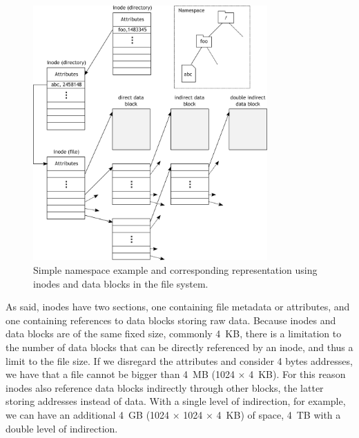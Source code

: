 \begin{figure}[!htb]
\centering
\includegraphics[width=0.8\textwidth]{figures/inode}
\caption{Simple namespace example and corresponding representation using inodes and data blocks in the file system.}
\label{figure: inode}
\end{figure}

As said, inodes have two sections, one containing file metadata or attributes, and one containing references to data blocks storing raw data. Because inodes and data blocks are of the same fixed size, commonly 4~KB, there 
is a limitation to the number of data blocks that can be directly referenced by an inode, and thus a limit to the file size. If we disregard the attributes and consider 4 bytes addresses, we have that a file cannot be 
bigger than 4~MB (1024 $\times$ 4~KB). For this reason inodes also reference data blocks indirectly through other blocks, the latter storing addresses instead of data. With a single level of indirection, for example, we 
can have an additional 4~GB (1024 $\times$ 1024 $\times$ 4~KB) of space, 4~TB with a double level of indirection.

